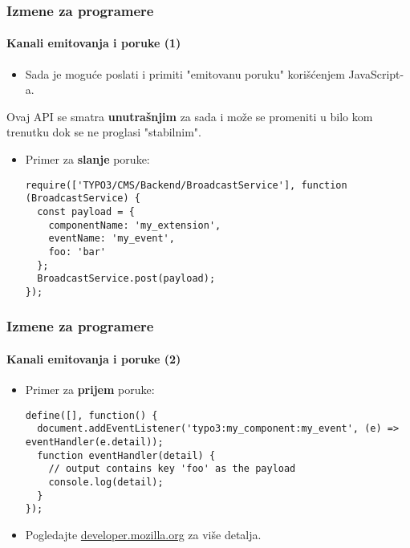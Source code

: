 \begin{frame}[fragile]
	\frametitle{Izmene za programere}
	\framesubtitle{Kanali emitovanja i poruke (1)}

	\lstset{basicstyle=\tiny\ttfamily}

	\begin{itemize}
		\item Sada je moguće poslati i primiti "emitovanu poruku" korišćenjem JavaScript-a.
	\end{itemize}

	\vspace{-0.2cm}
	\begingroup
		\color{red}
			\begin{center}
				Ovaj API se smatra \textbf{unutrašnjim} za sada i može se promeniti\newline
				 u bilo kom trenutku dok se ne proglasi "stabilnim".
			\end{center}
	\endgroup

	\begin{itemize}
		\item Primer za \textbf{slanje} poruke:

\begin{lstlisting}
require(['TYPO3/CMS/Backend/BroadcastService'], function (BroadcastService) {
  const payload = {
    componentName: 'my_extension',
    eventName: 'my_event',
    foo: 'bar'
  };
  BroadcastService.post(payload);
});
\end{lstlisting}

	\end{itemize}

\end{frame}


\begin{frame}[fragile]
	\frametitle{Izmene za programere}
	\framesubtitle{Kanali emitovanja i poruke (2)}

	\lstset{basicstyle=\tiny\ttfamily}

	\begin{itemize}
		\item Primer za \textbf{prijem} poruke:

\begin{lstlisting}
define([], function() {
  document.addEventListener('typo3:my_component:my_event', (e) => eventHandler(e.detail));
  function eventHandler(detail) {
    // output contains key 'foo' as the payload
    console.log(detail);
  }
});
\end{lstlisting}

		\item Pogledajte \href{https://developer.mozilla.org/en-US/docs/Web/API/Broadcast_Channel_API}{developer.mozilla.org} za više detalja.

	\end{itemize}

\end{frame}

